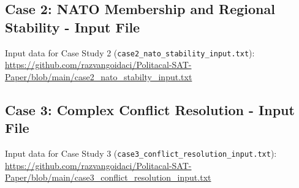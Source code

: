 \documentclass[11pt, a4paper]{article}
\begin{document}
\subsection{Case 2: NATO Membership and Regional Stability - Input File} \label{app:case2_input_link}
Input data for Case Study 2 (\texttt{case2\_nato\_stability\_input.txt}):
\url{https://github.com/razvangoidaci/Politacal-SAT-Paper/blob/main/case2_nato_stabilty_input.txt}

\subsection{Case 3: Complex Conflict Resolution - Input File} \label{app:case3_input_link}
Input data for Case Study 3 (\texttt{case3\_conflict\_resolution\_input.txt}):
\url{https://github.com/razvangoidaci/Politacal-SAT-Paper/blob/main/case3_conflict_resolution_input.txt}


\end{document}
